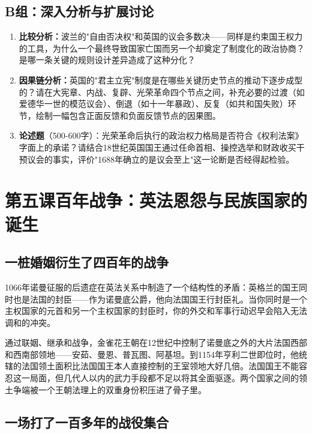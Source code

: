 \documentclass[a4paper,12pt]{ctexart}
\begin{document}
\subsection*{B组：深入分析与扩展讨论}

\begin{enumerate}[label=B\arabic*.]
  \item \textbf{比较分析：}波兰的"自由否决权"和英国的议会多数决——同样是约束国王权力的工具，为什么一个最终导致国家亡国而另一个却奠定了制度化的政治协商？是哪一条关键的规则设计差异造成了这种分化？
  \item \textbf{因果链分析：}英国的"君主立宪"制度是在哪些关键历史节点的推动下逐步成型的？请在大宪章、内战、复辟、光荣革命四个节点之间，补充必要的过渡（如爱德华一世的模范议会）、倒退（如十一年暴政）、反复（如共和国失败）环节，绘制一幅包含正面反馈和负面反馈节点的因果图。
  \item \textbf{论述题}（500-600字）：光荣革命后执行的政治权力格局是否符合《权利法案》字面上的承诺？请结合18世纪英国国王通过任命首相、操控选举和财政收买干预议会的事实，评价"1688年确立的是议会至上"这一论断是否经得起检验。
\end{enumerate}

\newpage
\section{第五课\quad 百年战争：英法恩怨与民族国家的诞生}

\subsection{一桩婚姻衍生了四百年的战争}

1066年诺曼征服的后遗症在英法关系中制造了一个结构性的矛盾：英格兰的国王同时也是法国的封臣——作为诺曼底公爵，他向法国国王行封臣礼。当你同时是一个主权国家的元首和另一个主权国家的封臣时，你的外交和军事行动迟早会陷入无法调和的冲突。

通过联姻、继承和战争，金雀花王朝在12世纪中控制了诺曼底之外的大片法国西部和西南部领地——安茹、曼恩、普瓦图、阿基坦。到1154年亨利二世即位时，他统辖的法国领土面积比法国国王本人直接控制的王室领地大好几倍。法国国王不能容忍这一局面，但几代人以内的武力手段都不足以将其全面驱逐。两个国家之间的领土争端被一个王朝法理上的双重身份积压进了骨子里。

\subsection{一场打了一百多年的战役集合}
\end{document}
